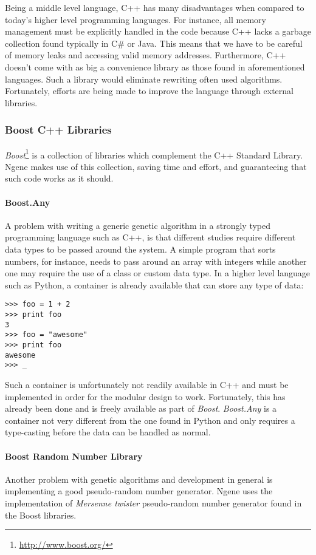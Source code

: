 Being a middle level language, C++ has many disadvantages when compared to today's higher level programming languages. For instance, all memory management must be explicitly handled in the code because C++ lacks a garbage collection found typically in C\# or Java. This means that we have to be careful of memory leaks and accessing valid memory addresses. Furthermore, C++ doesn't come with as big a convenience library as those found in aforementioned languages. Such a library would eliminate rewriting often used algorithms. Fortunately, efforts are being made to improve the language through external libraries.

\subsubsection{Boost C++ Libraries}
\emph{Boost}\footnote{\url{http://www.boost.org/}} is a collection of libraries which complement the C++ Standard Library. Ngene makes use of this collection, saving time and effort, and guaranteeing that such code works as it should.

\paragraph{\textbf{Boost.Any}}\cite{henney2001}
A problem with writing a generic genetic algorithm in a strongly typed programming language such as C++, is that different studies require different data types to be passed around the system. A simple program that sorts numbers, for instance, needs to pass around an array with integers while another one may require the use of a class or custom data type. In a higher level language such as Python, a container is already available that can store any type of data:

\begin{verbatim}
>>> foo = 1 + 2
>>> print foo
3
>>> foo = "awesome"
>>> print foo
awesome
>>> _
\end{verbatim}

Such a container is unfortunately not readily available in C++ and must be implemented in order for the modular design to work. Fortunately, this has already been done and is freely available as part of \emph{Boost}. \emph{Boost.Any} is a container not very different from the one found in Python and only requires a type-casting before the data can be handled as normal.

\paragraph{\textbf{Boost Random Number Library}}\cite{maurer2000}
Another problem with genetic algorithms and development in general is implementing a good pseudo-random number generator. Ngene uses the implementation of \emph{Mersenne twister} pseudo-random number generator found in the Boost libraries.

